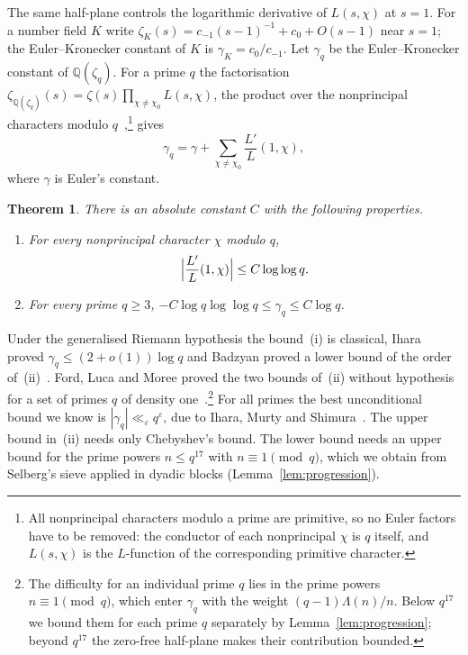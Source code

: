 \documentclass{aomart}
\numberwithin{equation}{section}
\newtheorem{theorem}{Theorem}[section]
\theoremstyle{definition}
\begin{document}
The same half-plane controls the logarithmic derivative of $L(s,\chi)$ at $s=1$. For a number
field $K$ write $\zeta_K(s)=c_{-1}(s-1)^{-1}+c_0+O(s-1)$ near $s=1$; the Euler--Kronecker
constant of $K$ is $\gamma_K=c_0/c_{-1}$. Let $\gamma_q$ be the Euler--Kronecker constant of
$\mathbb Q(\zeta_q)$. For a prime $q$ the factorisation $\zeta_{\mathbb Q(\zeta_q)}(s)
=\zeta(s)\prod_{\chi\ne\chi_0}L(s,\chi)$, the product over the nonprincipal characters modulo
$q$~\cite[Theorem~4.3]{Was97},\footnote{All nonprincipal characters modulo a prime are
primitive, so no Euler factors have to be removed: the conductor of each nonprincipal $\chi$ is
$q$ itself, and $L(s,\chi)$ is the $L$-function of the corresponding primitive character.} gives
\begin{equation}\label{eq:gammaq}
  \gamma_q=\gamma+\sum_{\chi\ne\chi_0}\frac{L'}{L}(1,\chi),
\end{equation}
where $\gamma$ is Euler's constant.

\begin{theorem}\label{thm:ek}
There is an absolute constant $C$ with the following properties.
\begin{enumerate}
\item[(i)] For every nonprincipal character $\chi$ modulo $q$,
\[
  \Bigl|\frac{L'}{L}(1,\chi)\Bigr|\le C\log\log q.
\]
\item[(ii)] For every prime $q\ge3$,
$-C\log q\log\log q\le\gamma_q\le C\log q$.
\end{enumerate}
\end{theorem}

Under the generalised Riemann hypothesis the bound~(i) is classical, Ihara proved
$\gamma_q\le(2+o(1))\log q$ and Badzyan proved a lower bound of the order
of~(ii)~\cite{Iha06,Bad10}. Ford, Luca and Moree proved the two bounds of~(ii) without hypothesis
for a set of primes $q$ of density one~\cite{FLM14,Mor18}.\footnote{The difficulty for an
individual prime $q$ lies in the prime powers $n\equiv1\pmod q$, which enter $\gamma_q$ with the
weight $(q-1)\Lambda(n)/n$. Below $q^{17}$ we bound them for each prime $q$ separately by
Lemma~\ref{lem:progression}; beyond $q^{17}$ the zero-free half-plane makes their contribution
bounded.} For all primes the best unconditional bound we know is
$|\gamma_q|\ll_\varepsilon q^\varepsilon$, due to Ihara, Murty and Shimura~\cite{IMS09}. The
upper bound in~(ii) needs only Chebyshev's bound. The lower bound needs an upper bound for the
prime powers $n\le q^{17}$ with $n\equiv1\pmod q$, which we obtain from Selberg's sieve applied
in dyadic blocks (Lemma~\ref{lem:progression}).
\end{document}
